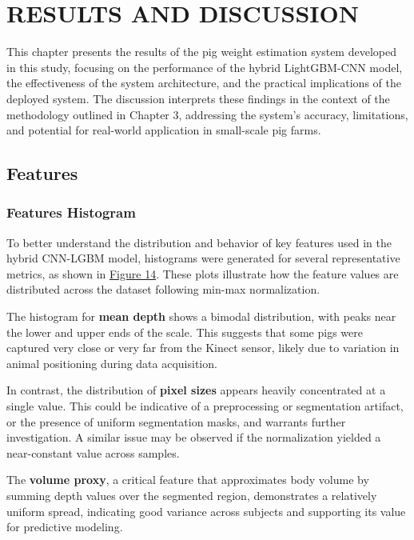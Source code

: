 \chapter{RESULTS AND DISCUSSION}

{\baselineskip}

This chapter presents the results of the pig weight estimation system developed in this study, focusing on the performance of the hybrid LightGBM-CNN model, the effectiveness of the system architecture, and the practical implications of the deployed system. The discussion interprets these findings in the context of the methodology outlined in Chapter 3, addressing the system's accuracy, limitations, and potential for real-world application in small-scale pig farms.

\section{Features}

\subsection{Features Histogram}

To better understand the distribution and behavior of key features used in the hybrid CNN-LGBM model, histograms were generated for several representative metrics, as shown in \hyperref[fig:Features Histogram]{Figure 14}. These plots illustrate how the feature values are distributed across the dataset following min-max normalization.

The histogram for \textbf{mean depth} shows a bimodal distribution, with peaks near the lower and upper ends of the scale. This suggests that some pigs were captured very close or very far from the Kinect sensor, likely due to variation in animal positioning during data acquisition.

In contrast, the distribution of \textbf{pixel sizes} appears heavily concentrated at a single value. This could be indicative of a preprocessing or segmentation artifact, or the presence of uniform segmentation masks, and warrants further investigation. A similar issue may be observed if the normalization yielded a near-constant value across samples.

The \textbf{volume proxy}, a critical feature that approximates body volume by summing depth values over the segmented region, demonstrates a relatively uniform spread, indicating good variance across subjects and supporting its value for predictive modeling.

